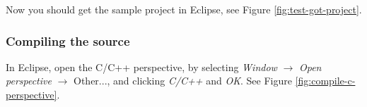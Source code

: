 \documentclass[a4paper, 10pt]{article}
\begin{document}







Now you should get the sample project in Eclipse, see
Figure \ref{fig:test-got-project}.

\subsubsection{Compiling the source}

In Eclipse, open the C/C++ perspective,  by selecting \emph{Window} $\rightarrow$
\emph{Open perspective} $\rightarrow$ Other...,
and clicking \emph{C/C++} and \emph{OK}.
See Figure \ref{fig:compile-c-perspective}.
\end{document}
